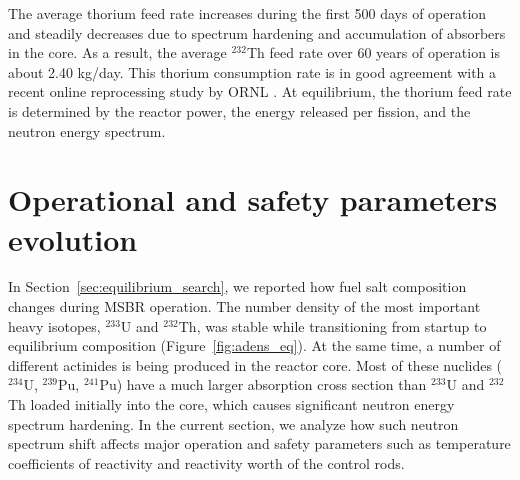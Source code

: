 The average thorium feed rate increases during the first 500 days of operation 
and steadily decreases due to spectrum hardening and accumulation of absorbers 
in the core. As a result, the average $^{232}$Th feed rate over 60 years of 
operation is about 2.40 kg/day. This thorium consumption rate is in good 
agreement with a recent online reprocessing study by \gls{ORNL}  
\cite{betzler_molten_2017}. At equilibrium, the thorium feed rate is 
determined by the reactor power, the energy released per fission, and the 
neutron energy spectrum.


\section{Operational and safety parameters evolution}
In Section~\ref{sec:equilibrium_search}, we reported how fuel salt composition 
changes during \gls{MSBR} operation. The number density of the most 
important heavy isotopes, $^{233}$U and $^{232}$Th, was stable while 
transitioning from startup to equilibrium composition  
(Figure~\ref{fig:adens_eq}). At the same time, a number of different 
actinides is being produced in the reactor core. Most of these nuclides 
($^{234}$U, $^{239}$Pu, $^{241}$Pu) have a much larger absorption cross 
section than $^{233}$U and $^{232}$Th loaded initially into the core, which 
causes significant neutron energy spectrum hardening. In the current section, 
we analyze how such neutron spectrum shift affects major operation and safety 
parameters such as temperature coefficients of reactivity and reactivity worth 
of the control rods. 


